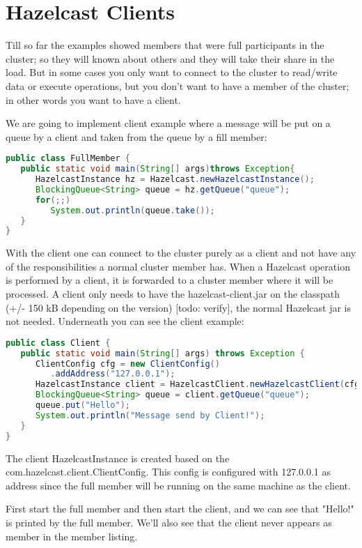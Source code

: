 \chapter{Hazelcast Clients}
Till so far the examples showed members that were full participants in the cluster; so they will known about others and they will take their share in the load. But in some cases you only want to connect to the cluster to read/write data or execute operations, but you don't want to have a member of the cluster; in other words you want to have a client.

We are going to implement client example where a message will be put on a queue by a client and taken from the queue by a fill member:
\begin{lstlisting}[language=java]
public class FullMember {
   public static void main(String[] args)throws Exception{
      HazelcastInstance hz = Hazelcast.newHazelcastInstance();
      BlockingQueue<String> queue = hz.getQueue("queue");
      for(;;) 
         System.out.println(queue.take());
   }
}
\end{lstlisting}

With the client one can connect to the cluster purely as a client and not have any of the responsibilities a normal cluster member has. When a Hazelcast operation is performed by a client, it is forwarded to a cluster member where it will be processed. A client only needs to have the hazelcast-client.jar on the classpath (+/- 150 kB depending on the version) [todo: verify], the normal Hazelcast jar is not needed. Underneath you can see the client example:
\begin{lstlisting}[language=java]
public class Client {
   public static void main(String[] args) throws Exception {
      ClientConfig cfg = new ClientConfig()
         .addAddress("127.0.0.1");
      HazelcastInstance client = HazelcastClient.newHazelcastClient(cfg);
      BlockingQueue<String> queue = client.getQueue("queue");
      queue.put("Hello");
      System.out.println("Message send by Client!");
   }
}
\end{lstlisting}
The client HazelcastInstance is created based on the com.hazelcast.client.ClientConfig. This config is configured with 127.0.0.1 as address since the full member will be running on the same machine as the client.

First start the full member and then start the client, and we can see that "Hello!" is printed by the full member. We'll also see that the client never appears as member in the member listing.	
 
